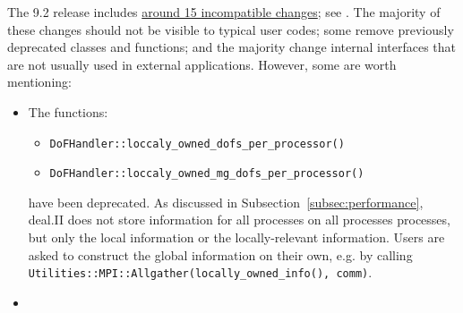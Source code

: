 \documentclass{ansarticle-preprint}
\begin{document}
The 9.2 release includes
\href{https://dealii.org/developer/doxygen/deal.II/changes_between_9_1_1_and_9_2_0.html}
     {around 15 incompatible changes}; see \cite{changes92}. The majority of these changes
should not be visible to typical user codes; some remove previously
deprecated classes and functions; and the majority change internal
interfaces that are not usually used in external
applications. However, some are worth mentioning:
\begin{itemize}
\item The functions:
\begin{itemize}
\item \texttt{DoFHandler::loccaly\_owned\_dofs\_per\_processor()}
\item \texttt{DoFHandler::loccaly\_owned\_mg\_dofs\_per\_processor()}
\end{itemize} have been deprecated. As discussed in Subsection~\ref{subsec:performance}, deal.II does not store information for all processes on all processes processes, but only the local information or the locally-relevant information. Users are asked to construct the global information on their own, e.g. by calling \texttt{Utilities::MPI::Allgather(locally\_owned\_info(), comm)}.
\item 

\end{itemize}
\end{document}
